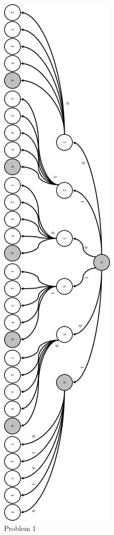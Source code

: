 \documentclass[times]{article}
\begin{document}
		\begin{figure}[H]
			\caption{Problem 1}
			\includegraphics[height=\textheight]{q1.png}
		\end{figure}
	
\end{document}
